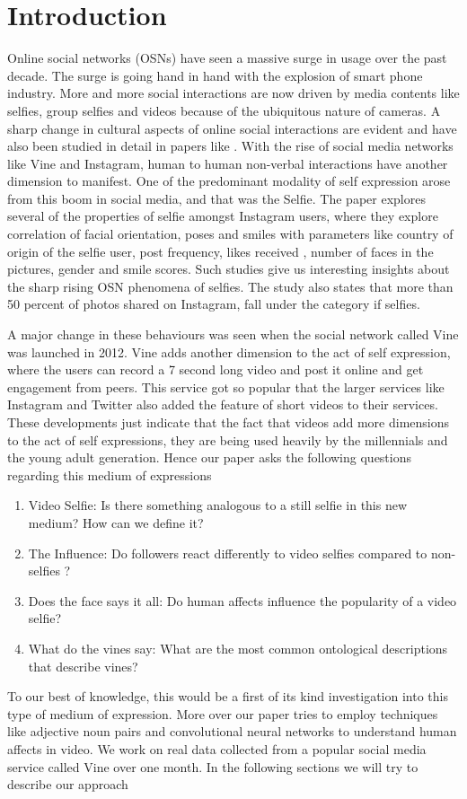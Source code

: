 \section{Introduction}
Online social networks (OSNs) have seen a massive surge in usage over the past decade. The surge is going hand in hand with the explosion of smart phone industry. More and more social interactions are now driven by media contents like selfies, group selfies and videos because of the ubiquitous nature of cameras. A sharp change in cultural aspects of online social interactions are evident and have also been studied in detail in papers like \cite{Souza2015}. 
With the rise of social media networks like Vine and Instagram, human to human non-verbal interactions have another dimension to manifest. One of the predominant modality of self expression arose from this boom in social media, and that was the Selfie. The \cite{Souza2015} paper explores several of the properties of selfie amongst Instagram users, where they explore correlation of facial orientation, poses and smiles with parameters like country of origin of the selfie user, post frequency, likes received , number of faces in the pictures, gender and smile scores. Such studies give us interesting insights about the sharp rising OSN phenomena of selfies. The study also states that more than 50 percent of photos shared on Instagram, fall under the category if selfies. 
\par
A major change in these behaviours was seen when the social network called Vine was launched in 2012. Vine adds another dimension to the act of self expression, where the users can record a 7 second long video and post it online and get engagement from peers. This service got so popular that the larger services like Instagram and Twitter also added the feature of short videos to their services. These developments just indicate that the fact that videos add more dimensions to the act of self expressions, they are being used heavily by the millennials and the young adult generation. Hence our paper asks the following questions regarding this medium of expressions

\begin{enumerate}
\item Video Selfie: Is there something analogous to a still selfie in this new medium? How can we define it?
\item The Influence: Do followers react differently to video selfies compared to non-selfies ? 
\item Does the face says it all: Do human affects influence the popularity of a video selfie? 
\item What do the vines say: What are the most common ontological descriptions that describe vines?
\end{enumerate}

To our best of knowledge, this would be a first of its kind investigation into this type of medium of expression. More over our paper tries to employ techniques like adjective noun pairs \cite{SentiBank} and convolutional neural networks \cite{Campos:2015:DDS:2813524.2813530} to understand human affects in video. We work on real data collected from a popular social media service called Vine over one month. In the following sections we will try to describe our approach
